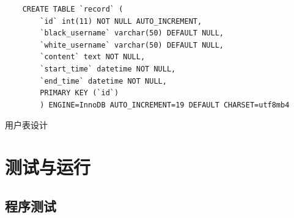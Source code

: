 \documentclass[utf8]{article}
\begin{document}
\begin{listing}[H]
    \begin{verbatim}
    CREATE TABLE `record` (
        `id` int(11) NOT NULL AUTO_INCREMENT,
        `black_username` varchar(50) DEFAULT NULL,
        `white_username` varchar(50) DEFAULT NULL,
        `content` text NOT NULL,
        `start_time` datetime NOT NULL,
        `end_time` datetime NOT NULL,
        PRIMARY KEY (`id`)
        ) ENGINE=InnoDB AUTO_INCREMENT=19 DEFAULT CHARSET=utf8mb4
    \end{verbatim}
    \caption{用户表设计}
\end{listing}
\section{测试与运行}
\subsection{程序测试}
\end{document}
